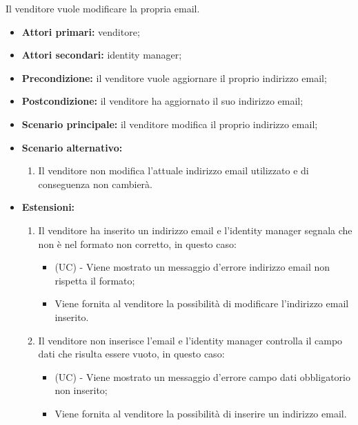 Il venditore vuole modificare la propria email.
\begin{itemize}
    \item \textbf{Attori primari:} venditore;
    \item \textbf{Attori secondari:} identity manager;
    \item \textbf{Precondizione:} il venditore vuole aggiornare il proprio indirizzo email;
    \item \textbf{Postcondizione:} il venditore ha aggiornato il suo indirizzo email;
    \item \textbf{Scenario principale:} il venditore modifica il proprio indirizzo email;
    \item \textbf{Scenario alternativo:}
    \begin{enumerate}[label=\lett]
    	\item Il venditore non modifica l'attuale indirizzo email utilizzato e di conseguenza non cambierà.
    \end{enumerate}
    \item \textbf{Estensioni:}
    \begin{enumerate}[label=\lett]
    	\item Il venditore ha inserito un indirizzo email e l'identity manager segnala che non è nel formato non corretto, in questo caso:
    	\begin{itemize}
    		\item (UC) - Viene mostrato un messaggio d'errore indirizzo email non rispetta il formato;
    		\item Viene fornita al venditore la possibilità di modificare l'indirizzo email inserito.
    	\end{itemize}
	    \item Il venditore non inserisce l'email e l'identity manager controlla il campo dati che risulta essere vuoto, in questo caso:
	    \begin{itemize}
	    	\item (UC) - Viene mostrato un messaggio d'errore campo dati obbligatorio non inserito;
	    	\item Viene fornita al venditore la possibilità di inserire un indirizzo email.
	    \end{itemize}
    \end{enumerate} 
\end{itemize}


